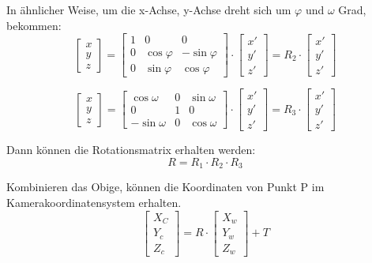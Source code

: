 In ähnlicher Weise, um die x-Achse, y-Achse dreht sich um $\varphi$ und $\omega$ Grad, bekommen:
\begin{equation}
   \begin{bmatrix}
	x \\  
	y \\
	z
	\end{bmatrix} = \begin{bmatrix}
		1   & 0          & 0	\\
		0   & \cos\varphi & -\sin\varphi	\\
	    0   & \sin\varphi& \cos\varphi	
	\end{bmatrix} \cdot \begin{bmatrix}
	x' \\  
	y' \\
	z'
	\end{bmatrix}= R_2 \cdot \begin{bmatrix}
	x' \\  
	y' \\
	z'
	\end{bmatrix}
\end{equation}

\begin{equation}
   \begin{bmatrix}
	x \\  
	y \\
	z
	\end{bmatrix} = \begin{bmatrix}
	\cos\omega  & 0           & \sin\omega	\\		
	0    	    & 1           & 0	\\
	-\sin\omega &0            &  \cos\omega
	\end{bmatrix} \cdot \begin{bmatrix}
	x' \\  
	y' \\
	z'
	\end{bmatrix}= R_3 \cdot \begin{bmatrix}
	x' \\  
	y' \\
	z'
	\end{bmatrix}
\end{equation}

Dann können die Rotationsmatrix erhalten werden:
\begin{equation}
   R = R_1 \cdot R_2 \cdot R_3
\end{equation}

Kombinieren das Obige, können die Koordinaten von Punkt P im Kamerakoordinatensystem erhalten.
\begin{equation}
   \begin{bmatrix}
	X_C \\  
	Y_c \\
	Z_c
	\end{bmatrix} = R \cdot \begin{bmatrix}
	X_w \\  
	Y_w \\
	Z_w 
	\end{bmatrix} +T
\end{equation}


